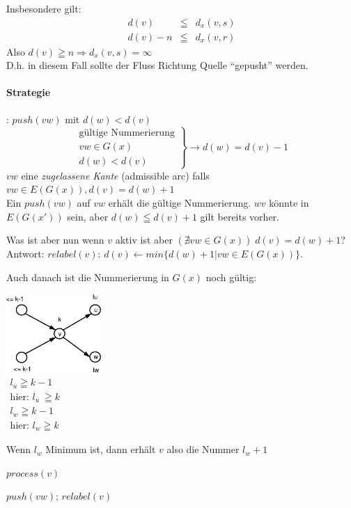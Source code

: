 Insbesondere gilt:
\[\begin{array}{rcl}d(v) &\leqq& d_{x}(v,s)\\
d(v)-n &\leqq & d_{x}(v,r)\end{array}\]
Also $d(v) \geqq n \Rightarrow d_{x}(v,s) = \infty$\\
D.h. in diesem Fall sollte der Fluss Richtung Quelle "`gepusht"' werden.

\paragraph{Strategie}: $push(v w)$ mit $d(w) < d(v)$\\
\[\left.\begin{array}{l}
\mbox{gültige Nummerierung}\\
v w \in G(x)\\
d(w) < d(v)\end{array} \right\}\rightarrow d(w) = d(v) -1\]
$v w$ eine {\em zugelassene Kante} (admissible arc) falls $v w \in E(G(x)), d(v) =
d(w) +1$\\
Ein $push(v w)$ auf $v w$ erhält die gültige Nummerierung. $w v$ könnte in
$E(G(x'))$ sein, aber $d(w) \leqq d(v)+1$ gilt bereits vorher.

Was ist aber nun wenn $v$ aktiv ist aber $(\nexists v w \in G(x)) \; d(v) =
d(w) +1$? Antwort: $relabel(v)$: $d(v) \leftarrow min\{d(w) +1| v w \in
E(G(x))\}$.

Auch danach ist die Nummerierung in $G(x)$ noch gültig:

\includegraphics[height=3cm]{bilder/3-0PushOp}
\\$\begin{array}{l}l_{u} \geqq k -1\\
\mbox{hier: }l_{u}\ \geqq k\\
l_{w} \geqq k -1\\
\mbox{hier: }l_{w}\geqq k\end{array}$

Wenn $l_{w}$ Minimum ist, dann erhält $v$ also die Nummer $l_{w}+1$

$process(v)$
\begin{algorithmic}
\STATE $push(v w)$;
\STATE $relabel(v)$
\ENDIF
\ENDWHILE
\end{algorithmic}


